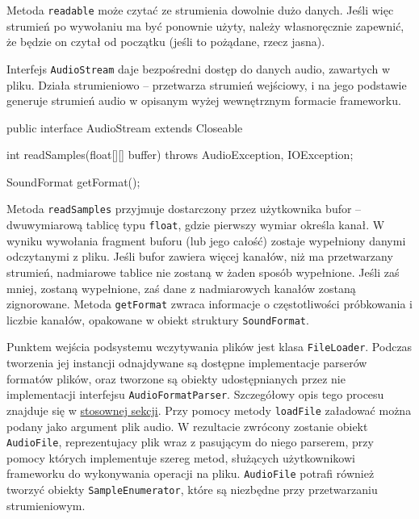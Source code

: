 \begin{Note}
Metoda \texttt{readable} może czytać ze strumienia dowolnie dużo danych. Jeśli więc strumień po
wywołaniu ma być ponownie użyty, należy własnoręcznie zapewnić, że będzie on czytał od początku
(jeśli to pożądane, rzecz jasna).  
\end{Note}

Interfejs \texttt{AudioStream} daje bezpośredni dostęp do danych audio, zawartych w pliku. Działa
strumieniowo -- przetwarza strumień wejściowy, i na jego podstawie generuje strumień audio w
opisanym wyżej wewnętrznym formacie frameworku.

\begin{java}
public interface AudioStream extends Closeable {

    int readSamples(float[][] buffer) throws AudioException, IOException;

    SoundFormat getFormat();

}
\end{java}

Metoda \texttt{readSamples} przyjmuje dostarczony przez użytkownika bufor -- dwuwymiarową tablicę typu
\texttt{float}, gdzie pierwszy wymiar określa kanał. W wyniku wywołania fragment buforu (lub jego
całość) zostaje wypełniony danymi odczytanymi z pliku. Jeśli bufor zawiera więcej kanałów, niż ma
przetwarzany strumień, nadmiarowe tablice nie zostaną w żaden sposób wypełnione. Jeśli zaś mniej,
zostaną wypełnione, zaś dane z nadmiarowych kanałów zostaną zignorowane. Metoda \texttt{getFormat}
zwraca informacje o częstotliwości próbkowania i liczbie kanałów, opakowane w obiekt struktury
\texttt{SoundFormat}.

Punktem wejścia podsystemu wczytywania plików jest klasa \texttt{FileLoader}. Podczas tworzenia jej
instancji odnajdywane są dostępne implementacje parserów formatów plików, oraz tworzone są obiekty
udostępnianych przez nie implementacji interfejsu \texttt{AudioFormatParser}. Szczegółowy opis tego
procesu znajduje się w \hyperref[sec:odnajdywanie_implementacji]{stosownej sekcji}. Przy pomocy
metody \texttt{loadFile} załadować można podany jako argument plik audio. W rezultacie zwrócony
zostanie obiekt \texttt{AudioFile}, reprezentujacy plik wraz z pasującym do niego parserem, przy
pomocy których implementuje szereg metod, służących użytkownikowi frameworku do wykonywania operacji
na pliku. \texttt{AudioFile} potrafi również tworzyć obiekty \texttt{SampleEnumerator}, które są
niezbędne przy przetwarzaniu strumieniowym.

